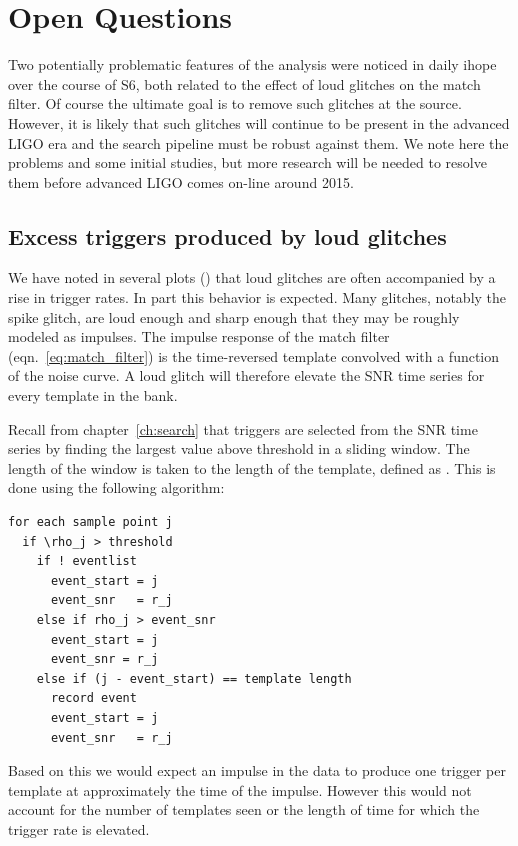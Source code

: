 \section{Open Questions}

Two potentially problematic features of the analysis were noticed in
daily ihope over the course of S6, both related to the effect of loud
glitches on the match filter.  Of course the ultimate goal is to
remove such glitches at the source.  However, it is likely that such
glitches will continue to be present in the advanced LIGO era and the
search pipeline must be robust against them.  We note here the
problems and some initial studies, but more research will be needed to
resolve them before advanced LIGO comes on-line around 2015.


\subsection{Excess triggers produced by loud glitches}
\label{ssec:penguins}

We have noted in several plots () that loud glitches are
often accompanied by a rise in trigger rates.  In part this behavior
is expected.  Many glitches, notably the spike glitch, are loud enough
and sharp enough that they may be roughly modeled as impulses.  The
impulse response of the match filter (eqn.~\ref{eq:match_filter}) is
the time-reversed template convolved with a function of the noise
curve.  A loud glitch will therefore elevate the SNR time series for
every template in the bank.

Recall from chapter~\ref{ch:search} that triggers are selected from
the SNR time series by finding the largest value above threshold in a
sliding window.  The length of the window is taken to the length of
the template, defined as .  This is done using the
following algorithm: 

\begin{verbatim}
for each sample point j
  if \rho_j > threshold
    if ! eventlist
      event_start = j
      event_snr   = r_j
    else if rho_j > event_snr
      event_start = j
      event_snr = r_j
    else if (j - event_start) == template length
      record event
      event_start = j
      event_snr   = r_j
\end{verbatim}

Based on this we would expect an impulse in the data to produce one
trigger per template at approximately the time of the impulse.
However this would not account for the number of templates seen or the
length of time for which the trigger rate is elevated. 

